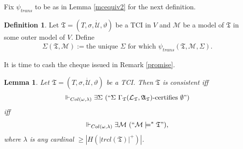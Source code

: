 \documentclass[12pt, twoside]{memoir}
\numberwithin{equation}{section}
\newtheorem{lem}[thm]{Lemma}
\theoremstyle{definition}
\newtheorem{defi}[thm]{Definition}
\theoremstyle{remark}
\theoremstyle{definition}
\theoremstyle{definition}
\theoremstyle{definition}
\theoremstyle{remark}
\begin{document}
Fix $\psi_{trans}$ to be as in Lemma \ref{mcequiv2} for the next definition. 

\begin{defi}
Let $\mathfrak{T} = (T, \sigma, \dot{\mathcal{U}}, \vartheta)$ be a TCI in $V$ and $\mathcal{M}$ be a model of $\mathfrak{T}$ in some outer model of $V$. Define \begin{align*}
    \Sigma(\mathfrak{T}, \mathcal{M}) := \text{the unique } \Sigma \text{ for which } \psi_{trans}(\mathfrak{T}, \mathcal{M}, \Sigma).
\end{align*}
\end{defi}

It is time to cash the cheque issued in Remark \ref{promise}.

\begin{lem}\label{conalt}
Let $\mathfrak{T} = (T, \sigma, \dot{\mathcal{U}}, \vartheta)$ be a TCI. Then $\mathfrak{T}$ is consistent iff $$\Vdash_{Col(\omega, \lambda)} \exists \Sigma \ (``\Sigma \ \Gamma_{\mathfrak{T}} (\mathcal{L}_{\mathfrak{T}}, \mathfrak{A}_{\mathfrak{T}})\text{-certifies } \emptyset")$$ iff
$$\Vdash_{Col(\omega, \lambda)} \exists \mathcal{M} \ (``\mathcal{M} \models^* \mathfrak{T}") \text{,}$$ where $\lambda$ is any cardinal $\geq |H(|trcl(\mathfrak{T})|^+)|$.
\end{lem}
\end{document}
